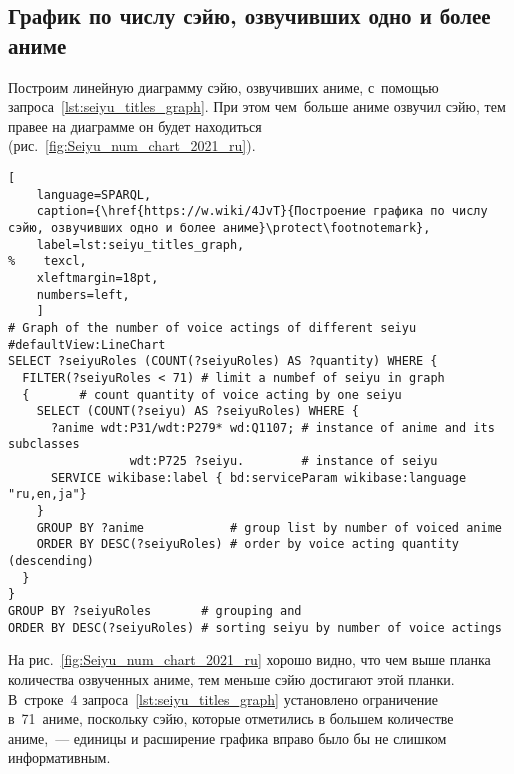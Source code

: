 \subsection{График по числу сэйю, озвучивших одно и более аниме}

Построим линейную диаграмму сэйю, озвучивших аниме, с~помощью запроса~\ref{lst:seiyu_titles_graph}. 
При этом чем~больше аниме озвучил сэйю, тем правее на диаграмме он будет находиться (рис.~\ref{fig:Seiyu_num_chart_2021_ru}). 

\begin{lstlisting}[ 
    language=SPARQL, 
    caption={\href{https://w.wiki/4JvT}{Построение графика по числу сэйю, озвучивших одно и более аниме}\protect\footnotemark},
    label=lst:seiyu_titles_graph,
%    texcl,
    xleftmargin=18pt, 
    numbers=left,
    ]
# Graph of the number of voice actings of different seiyu
#defaultView:LineChart
SELECT ?seiyuRoles (COUNT(?seiyuRoles) AS ?quantity) WHERE {
  FILTER(?seiyuRoles < 71) # limit a numbef of seiyu in graph
  {       # count quantity of voice acting by one seiyu
    SELECT (COUNT(?seiyu) AS ?seiyuRoles) WHERE { 
      ?anime wdt:P31/wdt:P279* wd:Q1107; # instance of anime and its subclasses
                 wdt:P725 ?seiyu.        # instance of seiyu
      SERVICE wikibase:label { bd:serviceParam wikibase:language "ru,en,ja"}
    }
    GROUP BY ?anime            # group list by number of voiced anime
    ORDER BY DESC(?seiyuRoles) # order by voice acting quantity (descending)
  }
}
GROUP BY ?seiyuRoles       # grouping and
ORDER BY DESC(?seiyuRoles) # sorting seiyu by number of voice actings
\end{lstlisting}%


\newpage
На рис.~\ref{fig:Seiyu_num_chart_2021_ru} хорошо видно, 
что чем выше планка количества озвученных аниме, 
тем меньше сэйю достигают этой планки. 
В~строке~4 запроса~\ref{lst:seiyu_titles_graph} установлено ограничение в~71~аниме, 
поскольку сэйю, которые отметились в большем количестве аниме,~--- единицы и расширение графика вправо было бы не слишком информативным.

